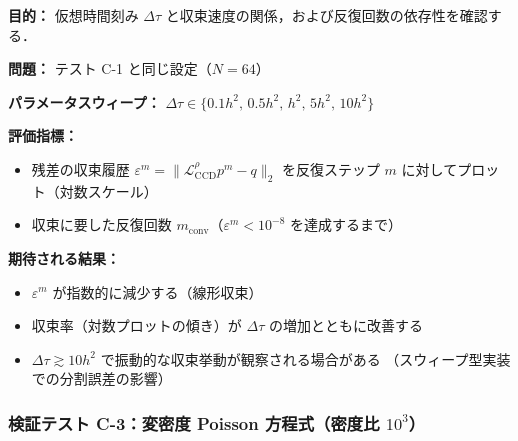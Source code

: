 \begin{tcolorbox}[algbox, title={テスト C-2 の設定}]
\textbf{目的：} 仮想時間刻み $\Delta\tau$ と収束速度の関係，および反復回数の依存性を確認する．

\textbf{問題：} テスト C-1 と同じ設定（$N=64$）

\textbf{パラメータスウィープ：}
$\Delta\tau \in \{0.1h^2,\, 0.5h^2,\, h^2,\, 5h^2,\, 10h^2\}$

\textbf{評価指標：}
\begin{itemize}
  \item 残差の収束履歴 $\varepsilon^m = \|\mathcal{L}_{\mathrm{CCD}}^{\rho}p^m - q\|_2$
        を反復ステップ $m$ に対してプロット（対数スケール）
  \item 収束に要した反復回数 $m_{\mathrm{conv}}$（$\varepsilon^m < 10^{-8}$ を達成するまで）
\end{itemize}

\textbf{期待される結果：}
\begin{itemize}
  \item $\varepsilon^m$ が指数的に減少する（線形収束）
  \item 収束率（対数プロットの傾き）が $\Delta\tau$ の増加とともに改善する
  \item $\Delta\tau \gtrsim 10h^2$ で振動的な収束挙動が観察される場合がある
        （スウィープ型実装での分割誤差の影響）
\end{itemize}
\end{tcolorbox}

\subsubsection{検証テスト C-3：変密度 Poisson 方程式（密度比 \texorpdfstring{$10^3$}{10\textasciicircum 3}）}
\label{sec:ccd_test_c3}


